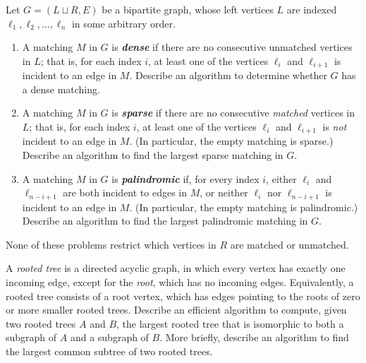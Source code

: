 \begin{exercises}
\item {}
\label{ex:11.21}
Let $G = (L \sqcup R, E)$ be a bipartite graph, whose left vertices $L$ are indexed $\ell_1, \ell_2, \dots, \ell_n$ in some arbitrary order.
\begin{enumerate}
\item A matching $M$ in $G$ is \textbf{\textit{dense}} if there are no consecutive unmatched vertices in $L$; that is, for each index $i$, at least one of the vertices $\ell_i$ and $\ell_{i+1}$ is incident to an edge in $M$.
Describe an algorithm to determine whether $G$ has a dense matching.
\item A matching $M$ in $G$ is \textbf{\textit{sparse}} if there are no consecutive \textit{matched} vertices in $L$; that is, for each index $i$, at least one of the vertices $\ell_i$ and $\ell_{i+1}$ is \textit{not} incident to an edge in $M$.
(In particular, the empty matching is sparse.)
Describe an algorithm to find the largest sparse matching in $G$.
\item A matching $M$ in $G$ is \textbf{\textit{palindromic}} if, for every index $i$, either $\ell_i$ and $\ell_{n-i+1}$ are both incident to edges in $M$, or neither $\ell_i$ nor $\ell_{n-i+1}$ is incident to an edge in $M$.
(In particular, the empty matching is palindromic.)
Describe an algorithm to find the largest palindromic matching in $G$.
\end{enumerate}
None of these problems restrict which vertices in $R$ are matched or unmatched.

\item {}
\label{ex:11.22}
A \textit{rooted tree} is a directed acyclic graph, in which every vertex has exactly one incoming edge, except for the \textit{root}, which has no incoming edges.
Equivalently, a rooted tree consists of a root vertex, which has edges pointing to the roots of zero or more smaller rooted trees.
Describe an efficient algorithm to compute, given two rooted trees $A$ and $B$, the largest rooted tree that is isomorphic to both a subgraph of $A$ and a subgraph of $B$.
More briefly, describe an algorithm to find the largest common subtree of two rooted trees.

\end{exercises}
